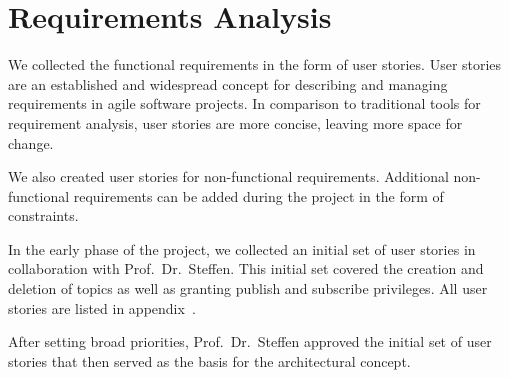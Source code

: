 \section{Requirements Analysis}

We collected the functional requirements in the form of user stories.
User stories are an established and widespread concept for describing and managing requirements in agile software projects.
In comparison to traditional tools for requirement analysis, user stories are more concise, leaving more space for change. \cite{wirdemann2017scrum}

We also created user stories for non-functional requirements.
Additional non-functional requirements can be added during the project in the form of constraints. \cite{wirdemann2017scrum}

In the early phase of the project, we collected an initial set of user stories in collaboration with Prof.\ Dr.\ Steffen.
This initial set covered the creation and deletion of \glspl{topic} as well as  granting publish and subscribe privileges.
All user stories are listed in appendix~.

After setting broad priorities, Prof.\ Dr.\ Steffen approved the initial set of user stories that then served as the basis for the architectural concept.